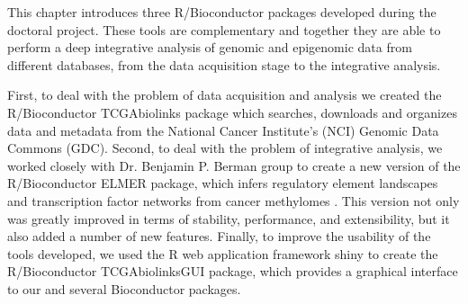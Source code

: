 
This chapter introduces three R/Bioconductor packages developed during the doctoral project. These tools are complementary and together they are able to perform a deep integrative analysis of genomic and epigenomic data from different databases, from the data acquisition stage to the integrative analysis.

First, to deal with the problem of data acquisition and analysis we created the   R/Bioconductor  TCGAbiolinks package which searches, downloads and organizes data and metadata from the National Cancer Institute's (NCI) Genomic Data Commons (GDC). Second, to deal with the problem of integrative analysis, we worked closely with Dr. Benjamin P. Berman group to create a new version of the R/Bioconductor ELMER package, which infers regulatory element landscapes and transcription factor  networks from cancer methylomes \cite{yao2015inferring}. This version not only was greatly improved in terms of stability, performance, and extensibility, but it also added a number of new features.
Finally, to improve the usability of the tools developed, we used the R web application framework shiny \cite{shiny} to create the R/Bioconductor TCGAbiolinksGUI package, which provides a graphical interface to our and several Bioconductor packages.




